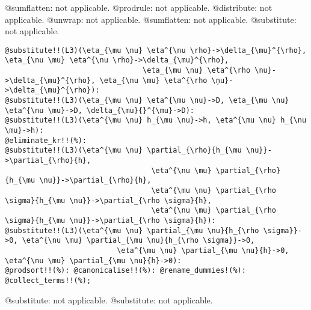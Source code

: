 \documentclass[11pt]{article}
\begin{document}
@sumflatten: not applicable.
@prodrule: not applicable.
@distribute: not applicable.
@unwrap: not applicable.
@sumflatten: not applicable.
@substitute: not applicable.
{\color[named]{Blue}\begin{verbatim}
@substitute!!(L3)(\eta_{\mu \nu} \eta^{\nu \rho}->\delta_{\mu}^{\rho}, \eta_{\nu \mu} \eta^{\nu \rho}->\delta_{\mu}^{\rho},
                                \eta_{\mu \nu} \eta^{\rho \nu}->\delta_{\mu}^{\rho}, \eta_{\nu \mu} \eta^{\rho \ņu}->\delta_{\mu}^{\rho}):
@substitute!!(L3)(\eta_{\mu \nu} \eta^{\mu \nu}->D, \eta_{\mu \nu} \eta^{\nu \mu}->D, \delta_{\mu}{}^{\mu}->D):
@substitute!!(L3)(\eta^{\mu \nu} h_{\mu \nu}->h, \eta^{\mu \nu} h_{\nu \mu}->h):
@eliminate_kr!!(%):
@substitute!!(L3)(\eta^{\mu \nu} \partial_{\rho}{h_{\mu \nu}}->\partial_{\rho}{h},
                                  \eta^{\nu \mu} \partial_{\rho}{h_{\mu \nu}}->\partial_{\rho}{h},
                                  \eta^{\mu \nu} \partial_{\rho \sigma}{h_{\mu \nu}}->\partial_{\rho \sigma}{h},
                                  \eta^{\nu \mu} \partial_{\rho \sigma}{h_{\mu \nu}}->\partial_{\rho \sigma}{h}):
@substitute!!(L3)(\eta^{\mu \nu} \partial_{\mu \nu}{h_{\rho \sigma}}->0, \eta^{\nu \mu} \partial_{\mu \nu}{h_{\rho \sigma}}->0,
                          \eta^{\mu \nu} \partial_{\mu \nu}{h}->0, \eta^{\nu \mu} \partial_{\mu \nu}{h}->0):
@prodsort!!(%): @canonicalise!!(%): @rename_dummies!(%): @collect_terms!!(%);
\end{verbatim}}
@substitute: not applicable.
@substitute: not applicable.
\end{document}
